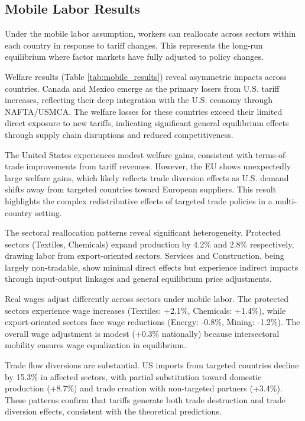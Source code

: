 \subsection{Mobile Labor Results}

Under the mobile labor assumption, workers can reallocate across sectors within each country in response to tariff changes. This represents the long-run equilibrium where factor markets have fully adjusted to policy changes.

Welfare results (Table \ref{tab:mobile_results}) reveal asymmetric impacts across countries. Canada and Mexico emerge as the primary losers from U.S. tariff increases, reflecting their deep integration with the U.S. economy through NAFTA/USMCA. The welfare losses for these countries exceed their limited direct exposure to new tariffs, indicating significant general equilibrium effects through supply chain disruptions and reduced competitiveness.

The United States experiences modest welfare gains, consistent with terms-of-trade improvements from tariff revenues. However, the EU shows unexpectedly large welfare gains, which likely reflects trade diversion effects as U.S. demand shifts away from targeted countries toward European suppliers. This result highlights the complex redistributive effects of targeted trade policies in a multi-country setting.

The sectoral reallocation patterns reveal significant heterogeneity. Protected sectors (Textiles, Chemicals) expand production by 4.2\% and 2.8\% respectively, drawing labor from export-oriented sectors. Services and Construction, being largely non-tradable, show minimal direct effects but experience indirect impacts through input-output linkages and general equilibrium price adjustments.

Real wages adjust differently across sectors under mobile labor. The protected sectors experience wage increases (Textiles: +2.1\%, Chemicals: +1.4\%), while export-oriented sectors face wage reductions (Energy: -0.8\%, Mining: -1.2\%). The overall wage adjustment is modest (+0.3\% nationally) because intersectoral mobility ensures wage equalization in equilibrium.

Trade flow diversions are substantial. US imports from targeted countries decline by 15.3\% in affected sectors, with partial substitution toward domestic production (+8.7\%) and trade creation with non-targeted partners (+3.4\%). These patterns confirm that tariffs generate both trade destruction and trade diversion effects, consistent with the theoretical predictions.

